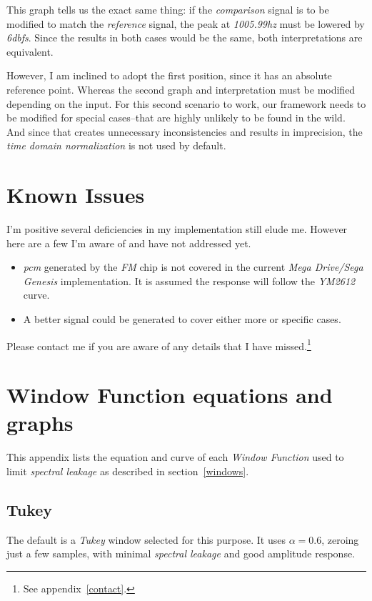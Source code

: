 \documentclass[10pt,a4paper]{report}
\newcommand{\ac}[1]{\textit{\mbox{\acrshort{#1}}}}
\newcommand{\hz}[1]{\textit{\mbox{#1\acrshort{hz}}}}
\newcommand{\db}[1]{\textit{\mbox{#1\acrshort{dbfs}}}}
\begin{document}
\begin{appendices}
This graph tells us the exact same thing: if the \textit{comparison} signal is to be modified to match the \textit{reference} signal, the peak at \hz{1005.99} must be lowered by \db{6}. Since the results in both cases would be the same, both interpretations are equivalent.
	
However, I am inclined to adopt the first position, since it has an absolute reference point. Whereas the second graph and interpretation must be modified depending on the input. For this second scenario to work, our framework needs to be modified for special cases--that are highly unlikely to be found in the wild. And since that creates unnecessary inconsistencies and results in imprecision, the \textit{time domain normalization} is not used by default.

\chapter{Known Issues}

I'm positive several deficiencies in my implementation still elude me. However here are a few I'm aware of and have not addressed yet.

\begin{itemize}
	\item \ac{pcm} generated by the \textit{FM} chip is not covered in the current \textit{Mega Drive/Sega Genesis} implementation. It is assumed the response will follow the \textit{YM2612} curve.
	\item A better signal could  be generated to cover either more or specific cases.
\end{itemize}

Please contact me if you are aware of any details that I have missed.\footnote{See appendix~\ref{contact}.}

\chapter{Window Function equations and graphs}
\label{windowfunctiondetails}

This appendix lists the equation and curve of each \textit{Window Function} used to limit \textit{spectral leakage} as described in section~\ref{windows}.

\section{Tukey}

The default is a \textit{Tukey} window selected for this purpose. It uses $\alpha = 0.6$, zeroing just a few samples, with minimal \textit{spectral leakage} and good amplitude response.


\end{appendices}
\end{document}
